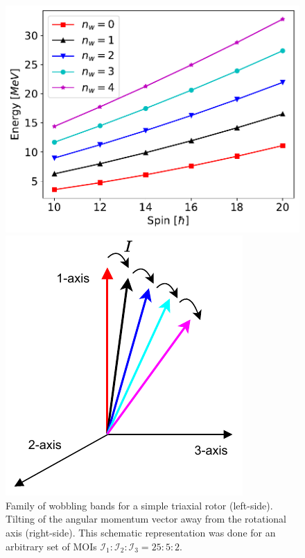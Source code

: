 \documentclass[11pt]{article}
\begin{document}
\begin{figure}
\centering
\begin{minipage}{.6\textwidth}
  \centering
  \includegraphics[width=1\linewidth]{figs/simple_wobbling_spectrum.pdf}
\end{minipage}%
\begin{minipage}{.4\textwidth}
  \centering
 \includegraphics[width=0.8\linewidth]{figs/wobbling_tilting_axis.pdf}
\end{minipage}
\label{simple-wobbling-family}
\caption{Family of wobbling bands for a simple triaxial rotor (left-side). Tilting of the angular momentum vector away from the rotational axis (right-side). This schematic representation was done for an arbitrary set of MOIs $\mathcal{I}_1:\mathcal{I}_2:\mathcal{I}_3=25:5:2$.}
\end{figure}
\end{document}
